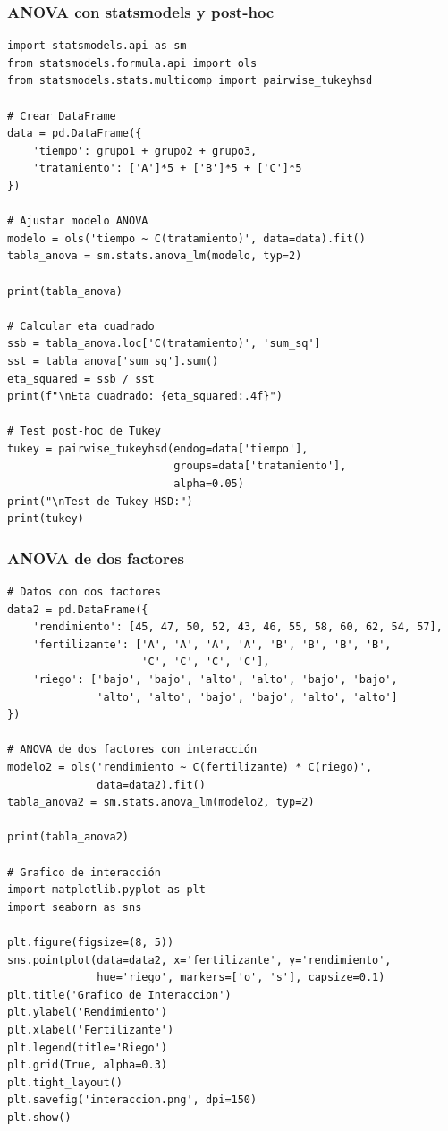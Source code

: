 \documentclass[11pt,a4paper]{article}
\theoremstyle{definition}
\begin{document}
\subsubsection{ANOVA con statsmodels y post-hoc}

\begin{lstlisting}[style=python, caption=ANOVA completo con tabla y post-hoc]
import statsmodels.api as sm
from statsmodels.formula.api import ols
from statsmodels.stats.multicomp import pairwise_tukeyhsd

# Crear DataFrame
data = pd.DataFrame({
    'tiempo': grupo1 + grupo2 + grupo3,
    'tratamiento': ['A']*5 + ['B']*5 + ['C']*5
})

# Ajustar modelo ANOVA
modelo = ols('tiempo ~ C(tratamiento)', data=data).fit()
tabla_anova = sm.stats.anova_lm(modelo, typ=2)

print(tabla_anova)

# Calcular eta cuadrado
ssb = tabla_anova.loc['C(tratamiento)', 'sum_sq']
sst = tabla_anova['sum_sq'].sum()
eta_squared = ssb / sst
print(f"\nEta cuadrado: {eta_squared:.4f}")

# Test post-hoc de Tukey
tukey = pairwise_tukeyhsd(endog=data['tiempo'], 
                          groups=data['tratamiento'], 
                          alpha=0.05)
print("\nTest de Tukey HSD:")
print(tukey)
\end{lstlisting}

\subsubsection{ANOVA de dos factores}

\begin{lstlisting}[style=python, caption=ANOVA de dos factores con interacción]
# Datos con dos factores
data2 = pd.DataFrame({
    'rendimiento': [45, 47, 50, 52, 43, 46, 55, 58, 60, 62, 54, 57],
    'fertilizante': ['A', 'A', 'A', 'A', 'B', 'B', 'B', 'B', 
                     'C', 'C', 'C', 'C'],
    'riego': ['bajo', 'bajo', 'alto', 'alto', 'bajo', 'bajo', 
              'alto', 'alto', 'bajo', 'bajo', 'alto', 'alto']
})

# ANOVA de dos factores con interacción
modelo2 = ols('rendimiento ~ C(fertilizante) * C(riego)', 
              data=data2).fit()
tabla_anova2 = sm.stats.anova_lm(modelo2, typ=2)

print(tabla_anova2)

# Grafico de interacción
import matplotlib.pyplot as plt
import seaborn as sns

plt.figure(figsize=(8, 5))
sns.pointplot(data=data2, x='fertilizante', y='rendimiento', 
              hue='riego', markers=['o', 's'], capsize=0.1)
plt.title('Grafico de Interaccion')
plt.ylabel('Rendimiento')
plt.xlabel('Fertilizante')
plt.legend(title='Riego')
plt.grid(True, alpha=0.3)
plt.tight_layout()
plt.savefig('interaccion.png', dpi=150)
plt.show()
\end{lstlisting}
\end{document}
